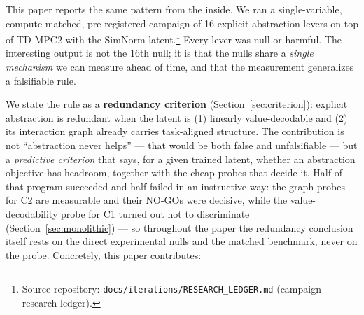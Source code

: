 \documentclass{article}
\begin{document}
This paper reports the same pattern from the inside. We ran a single-variable, compute-matched, pre-registered campaign of 16 explicit-abstraction levers on top of TD-MPC2 \citep{hansen2024tdmpc2} with the SimNorm latent.\footnote{Source repository: \texttt{docs/iterations/RESEARCH\_LEDGER.md} (campaign research ledger).} Every lever was null or harmful. The interesting output is not the 16th null; it is that the nulls share a \emph{single mechanism} we can measure ahead of time, and that the measurement generalizes a falsifiable rule.

We state the rule as a \textbf{redundancy criterion} (Section~\ref{sec:criterion}): explicit abstraction is redundant when the latent is (1) linearly value-decodable and (2) its interaction graph already carries task-aligned structure. The contribution is not ``abstraction never helps'' --- that would be both false and unfalsifiable --- but a \emph{predictive criterion} that says, for a given trained latent, whether an abstraction objective has headroom, together with the cheap probes that decide it. Half of that program succeeded and half failed in an instructive way: the graph probes for C2 are measurable and their NO-GOs were decisive, while the value-decodability probe for C1 turned out not to discriminate (Section~\ref{sec:monolithic}) --- so throughout the paper the redundancy conclusion itself rests on the direct experimental nulls and the matched benchmark, never on the probe. Concretely, this paper contributes:
\end{document}
